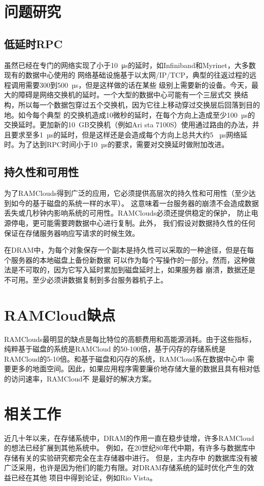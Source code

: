 \documentclass[translation]{zjutreport}
\begin{document}
\chapter{问题研究}
\section{低延时RPC}
虽然已经在专门的网络实现了小于10~μs的延时，如Infiniband和Myrinet，大多数现有的数据中心使用的
网络基础设施基于以太网/IP/TCP，典型的往返过程的远程调用需要300到500~µs，但是这样做的话在某些
级别上需要新的设备。今天，最大的障碍是网络交换机的延时。一个大型的数据中心可能有一个三层式交
换结构，所以每一个数据包穿过五个交换机，因为它往上移动穿过交换层后回落到目的地。如今每个典型
的交换机造成10微秒的延时，在每个方向上造成至少100~µs的交换延时。更加新的10~GB交换机（例如Ari
sta 7100S）使用通过路由的办法，并且要求至多1~µs的延时，但是这样还是会造成每个方向上总共大约5
~µs网络延时。为了达到RPC时间小于10~µs的要求，需要对交换延时做附加改进。

\section{持久性和可用性}
为了RAMClouds得到广泛的应用，它必须提供高层次的持久性和可用性（至少达到如今的基于磁盘的系统一样的水平）。
这意味着一台服务器的崩溃不会造成数据丢失或几秒钟内影响系统的可用性。RAMClouds必须还提供稳定的保护，
防止电源停电，更可能需要跨数据中心进行复制。此外，
我们假设对数据持久性的任何保证在存储服务器响应写请求的时候生效。

在DRAM中，为每个对象保存一个副本是持久性可以采取的一种途径，但是在每个服务器的本地磁盘上备份新数据
可以作为每个写操作的一部分。然而，这种做法是不可取的，因为它写入延时累加到磁盘延时上，如果服务器
崩溃，数据还是不可用。至少必须讲数据复制到多台服务器机子上。

\chapter{RAMCloud缺点}
RAMClouds最明显的缺点是每比特位的高额费用和高能源消耗。由于这些指标，纯粹基于磁盘的系统是RAMCloud
的50-100倍，基于闪存的存储系统是RAMCloud的5-10倍。和基于磁盘和闪存的系统，RAMCloud系在数据中心中
需要更多的地面空间。因此，如果应用程序需要廉价地存储大量的数据且具有相对低的访问速率，RAMCloud不
是最好的解决方案。

\chapter{相关工作}
近几十年以来，在存储系统中，DRAM的作用一直在稳步徒增，许多RAMCloud的想法已经扩展到其他系统中。
例如，在20世纪80年代中期，有许多与数据库中存储有关的实验研究都完全在主存储器中进行。
但是，主内存中
的数据库没有被广泛采用，也许是因为他们的能力有限。对DRAM存储系统的延时优化产生的效益已经在其他
项目中得到论证，例如Rio Vista。
\end{document}

